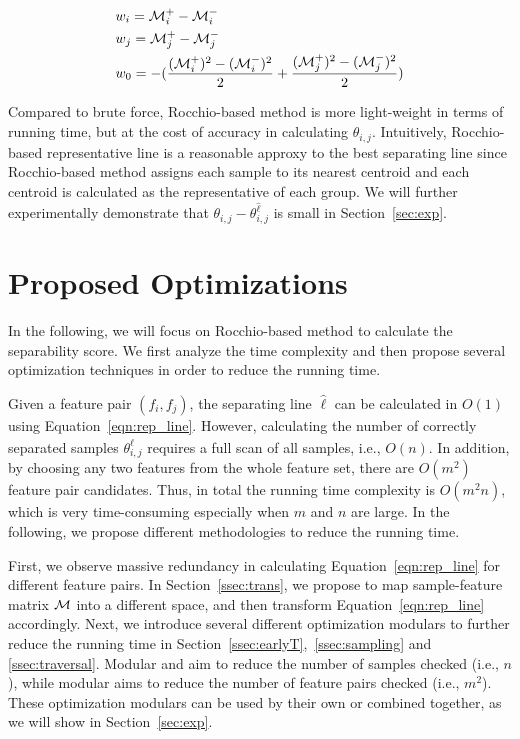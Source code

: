 \begin{equation}\label{eqn:rep_line}
\begin{split}
& w_i = \mm_i^+-\mm_i^- \\
& w_j = \mm_j^+-\mm_j^- \\
& w_0 = -(\frac{(\mm_i^+)^2-(\mm_i^-)^2}{2}+\frac{(\mm_j^+)^2-(\mm_j^-)^2}{2})
\end{split}
\end{equation}


 Compared to brute force, Rocchio-based method is more light-weight in terms of running time, but at the cost of accuracy in calculating $\theta_{i,j}$. Intuitively, Rocchio-based representative line is a reasonable approxy to the best separating line since Rocchio-based method assigns each sample to its nearest centroid and each centroid is calculated as the representative of each group. We will further experimentally demonstrate that $\theta_{i,j}-\theta_{i,j}^{\hat{\ell}}$ is small in Section~\ref{sec:exp}.

\section{Proposed Optimizations}\label{sec:opt}
In the following, we will focus on Rocchio-based method to calculate the separability score. We first analyze the time complexity and then propose several optimization techniques in order to reduce the running time. 

 Given a feature pair $(f_i, f_j)$, the separating line $\hat{\ell}$ can be calculated in $O(1)$ using Equation~\ref{eqn:rep_line}. However, calculating the number of correctly separated samples $\theta_{i,j}^{\hat{\ell}}$ requires a full scan of all samples, i.e., $O(n)$. In addition, by choosing any two features from the whole feature set, there are $O(m^2)$ feature pair candidates. Thus, in total the running time complexity is $O(m^2n)$, which is very time-consuming especially when $m$ and $n$ are large. In the following, we propose different methodologies to reduce the running time.

First, we observe massive redundancy in calculating Equation~\ref{eqn:rep_line} for different feature pairs. In Section~\ref{ssec:trans}, we propose to map sample-feature matrix $\mm$ into a different space, and then transform Equation~\ref{eqn:rep_line} accordingly. Next, we introduce several different optimization modulars to further reduce the running time in Section~\ref{ssec:earlyT},~\ref{ssec:sampling} and \ref{ssec:traversal}. Modular \earlyT and \sampling aim to reduce the number of samples checked (i.e., $n$), while modular \traversal aims to reduce the number of feature pairs checked (i.e., $m^2$). These optimization modulars can be used by their own or combined together, as we will show in Section~\ref{sec:exp}. 

